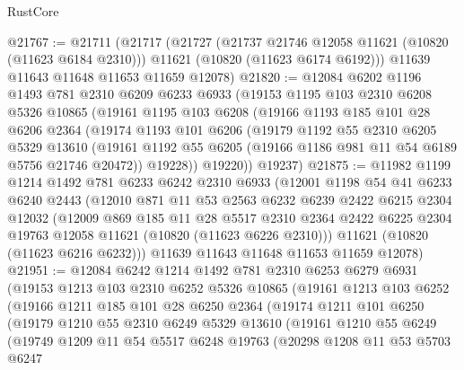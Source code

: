 \begin{lexlean}{RustCore}
\begin{coremodule}
@21767 := @21711
    (@21717
      (@21727
        (@21737 @21746 @12058 @11621 (@10820 (@11623 @6184 @2310)))
        @11621
        (@10820 (@11623 @6174 @6192)))
      @11639
      @11643
      @11648
      @11653
      @11659
      @12078)
@21820 := @12084
    @6202
    @1196
    @1493
    @781
    @2310
    @6209
    @6233
    @6933
    (@19153
      @1195
      @103
      @2310
      @6208
      @5326
      @10865
      (@19161
        @1195
        @103
        @6208
        (@19166
          @1193
          @185
          @101
          @28
          @6206
          @2364
          (@19174
            @1193
            @101
            @6206
            (@19179
              @1192
              @55
              @2310
              @6205
              @5329
              @13610
              (@19161 @1192 @55 @6205 (@19166 @1186 @981 @11 @54 @6189 @5756 @21746 @20472))
              @19228))
          @19220))
      @19237)
@21875 := @11982
    @1199
    @1214
    @1492
    @781
    @6233
    @6242
    @2310
    @6933
    (@12001
      @1198
      @54
      @41
      @6233
      @6240
      @2443
      (@12010
        @871
        @11
        @53
        @2563
        @6232
        @6239
        @2422
        @6215
        @2304
        @12032
        (@12009
          @869
          @185
          @11
          @28
          @5517
          @2310
          @2364
          @2422
          @6225
          @2304
          @19763
          @12058
          @11621
          (@10820 (@11623 @6226 @2310)))
        @11621
        (@10820 (@11623 @6216 @6232)))
      @11639
      @11643
      @11648
      @11653
      @11659
      @12078)
@21951 := @12084
    @6242
    @1214
    @1492
    @781
    @2310
    @6253
    @6279
    @6931
    (@19153
      @1213
      @103
      @2310
      @6252
      @5326
      @10865
      (@19161
        @1213
        @103
        @6252
        (@19166
          @1211
          @185
          @101
          @28
          @6250
          @2364
          (@19174
            @1211
            @101
            @6250
            (@19179
              @1210
              @55
              @2310
              @6249
              @5329
              @13610
              (@19161
                @1210
                @55
                @6249
                (@19749
                  @1209
                  @11
                  @54
                  @5517
                  @6248
                  @19763
                  (@20298
                    @1208
                    @11
                    @53
                    @5703
                    @6247

\end{coremodule}
\end{lexlean}
